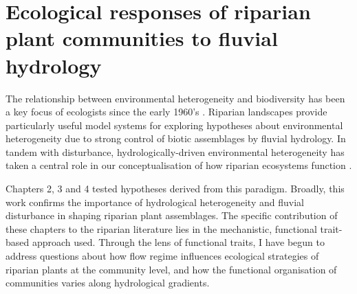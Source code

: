 \documentclass[openright,12pt,a4paper]{memoir}
\begin{document}
\section{Ecological responses of riparian plant communities to fluvial hydrology}
The relationship between environmental heterogeneity and biodiversity has been a key focus of ecologists since the early 1960’s \citep{MacArthur1961, Stein2014}. Riparian landscapes provide particularly useful model systems for exploring hypotheses about environmental heterogeneity due to strong control of biotic assemblages by fluvial hydrology. In tandem with disturbance, hydrologically-driven environmental heterogeneity has taken a central role in our conceptualisation of how riparian ecosystems function \citep{Poff1997, Naiman2005}.

Chapters 2, 3 and 4 tested hypotheses derived from this paradigm. Broadly, this work confirms the importance of hydrological heterogeneity and fluvial disturbance in shaping riparian plant assemblages. The specific contribution of these chapters to the riparian literature lies in the mechanistic, functional trait-based approach used. Through the lens of functional traits, I have begun to address questions about how flow regime influences ecological strategies of riparian plants at the community level, and how the functional organisation of communities varies along hydrological gradients.
\end{document}
